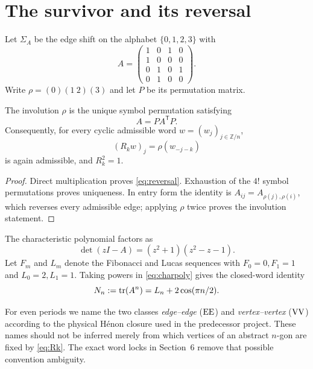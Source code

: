 \section{The survivor and its reversal}

Let $\Sigma_A$ be the edge shift on the alphabet $\{0,1,2,3\}$ with
\begin{equation}\label{eq:adjacency}
A=
\begin{pmatrix}
1&0&1&0\\
1&0&0&0\\
0&1&0&1\\
0&1&0&0
\end{pmatrix}.
\end{equation}
Write $\rho=(0)(1\ 2)(3)$ and let $P$ be its permutation matrix.

\begin{proposition}\label{prop:reversal}
The involution $\rho$ is the unique symbol permutation satisfying
\begin{equation}\label{eq:reversal}
A=P A^{\mathsf T}P.
\end{equation}
Consequently, for every cyclic admissible word $w=(w_j)_{j\in\mathbb Z/n}$,
\begin{equation}\label{eq:Rk}
(R_k w)_j=\rho(w_{-j-k})
\end{equation}
is again admissible, and $R_k^2=1$.
\end{proposition}

\begin{proof}
Direct multiplication proves \eqref{eq:reversal}.  Exhaustion of the
$4!$ symbol permutations proves uniqueness.  In entry form the identity is
$A_{ij}=A_{\rho(j),\rho(i)}$, which reverses every admissible edge; applying
$\rho$ twice proves the involution statement.
\end{proof}

The characteristic polynomial factors as
\begin{equation}\label{eq:charpoly}
\det(zI-A)=(z^2+1)(z^2-z-1).
\end{equation}
Let $F_m$ and $L_m$ denote the Fibonacci and Lucas sequences with
$F_0=0,F_1=1$ and $L_0=2,L_1=1$.  Taking powers in
\eqref{eq:charpoly} gives the closed-word identity
\begin{equation}\label{eq:closed}
N_n:=\operatorname{tr}(A^n)=L_n+2\cos(\pi n/2).
\end{equation}

For even periods we name the two classes \emph{edge--edge} ($\mathrm{EE}$) and
\emph{vertex--vertex} ($\mathrm{VV}$) according to the physical H\'enon closure used
in the predecessor project.  These names should not be inferred merely from
which vertices of an abstract $n$-gon are fixed by \eqref{eq:Rk}.  The exact
word locks in Section~6 remove that possible convention ambiguity.
